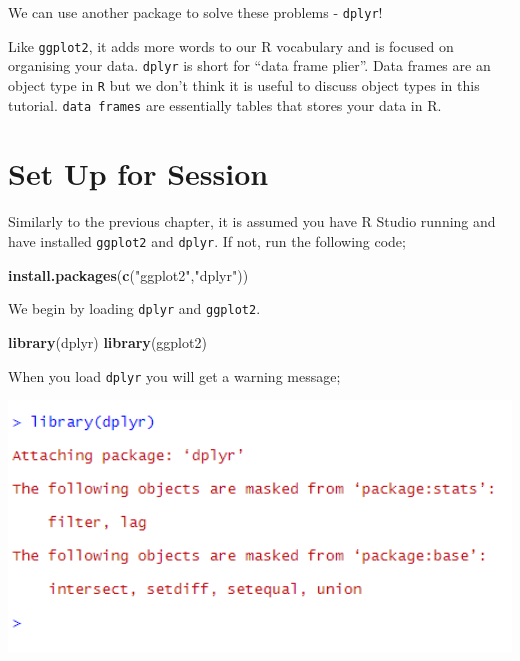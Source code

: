 \documentclass[]{book}
\newenvironment{Shaded}{\begin{snugshade}}{\end{snugshade}}
\newcommand{\KeywordTok}[1]{\textcolor[rgb]{0.13,0.29,0.53}{\textbf{#1}}}
\newcommand{\NormalTok}[1]{#1}
\newcommand{\StringTok}[1]{\textcolor[rgb]{0.31,0.60,0.02}{#1}}
\begin{document}
We can use another package to solve these problems - \texttt{dplyr}! \citep{R-dplyr}

Like \texttt{ggplot2}, it adds more words to our R vocabulary and is focused on organising your data. \texttt{dplyr} is short for ``data frame plier''. Data frames are an object type in \texttt{R} but we don't think it is useful to discuss object types in this tutorial. \texttt{data\ frames} are essentially tables that stores your data in R.

\hypertarget{set-up-for-session}{%
\section{Set Up for Session}\label{set-up-for-session}}

Similarly to the previous chapter, it is assumed you have R Studio running and have installed \texttt{ggplot2} and \texttt{dplyr}. If not, run the following code;

\begin{Shaded}
\begin{Highlighting}[]
\KeywordTok{install.packages}\NormalTok{(}\KeywordTok{c}\NormalTok{(}\StringTok{"ggplot2"}\NormalTok{,}\StringTok{"dplyr"}\NormalTok{))}
\end{Highlighting}
\end{Shaded}

We begin by loading \texttt{dplyr} and \texttt{ggplot2}.

\begin{Shaded}
\begin{Highlighting}[]
\KeywordTok{library}\NormalTok{(dplyr)}
\KeywordTok{library}\NormalTok{(ggplot2)}
\end{Highlighting}
\end{Shaded}

When you load \texttt{dplyr} you will get a warning message;

\includegraphics[width=6.28in]{Images/dplyrerror}
\end{document}
